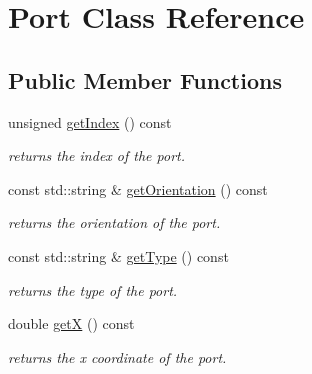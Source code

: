 \hypertarget{class_open_chams_1_1_port}{}\section{Port Class Reference}
\label{class_open_chams_1_1_port}
\subsection*{Public Member Functions}
\begin{DoxyCompactItemize}
\item 
\mbox{\label{class_open_chams_1_1_port_a743f20da85b9a06d9984c0adc337afc1}} 
unsigned \mbox{\hyperlink{class_open_chams_1_1_port_a743f20da85b9a06d9984c0adc337afc1}{get\+Index}} () const
\begin{DoxyCompactList}\small\item\em returns the index of the port. \end{DoxyCompactList}\item 
\mbox{\label{class_open_chams_1_1_port_ace51e4bf9cee0319600c14723efa0dfb}} 
const std\+::string \& \mbox{\hyperlink{class_open_chams_1_1_port_ace51e4bf9cee0319600c14723efa0dfb}{get\+Orientation}} () const
\begin{DoxyCompactList}\small\item\em returns the orientation of the port. \end{DoxyCompactList}\item 
\mbox{\label{class_open_chams_1_1_port_a49fc4eb493558cf55dd00df9ef5f8f08}} 
const std\+::string \& \mbox{\hyperlink{class_open_chams_1_1_port_a49fc4eb493558cf55dd00df9ef5f8f08}{get\+Type}} () const
\begin{DoxyCompactList}\small\item\em returns the type of the port. \end{DoxyCompactList}\item 
\mbox{\label{class_open_chams_1_1_port_a344385751bee0720059403940d57a13e}} 
double \mbox{\hyperlink{class_open_chams_1_1_port_a344385751bee0720059403940d57a13e}{getX}} () const
\begin{DoxyCompactList}\small\item\em returns the x coordinate of the port. \end{DoxyCompactList}\item 

\end{DoxyCompactItemize}
